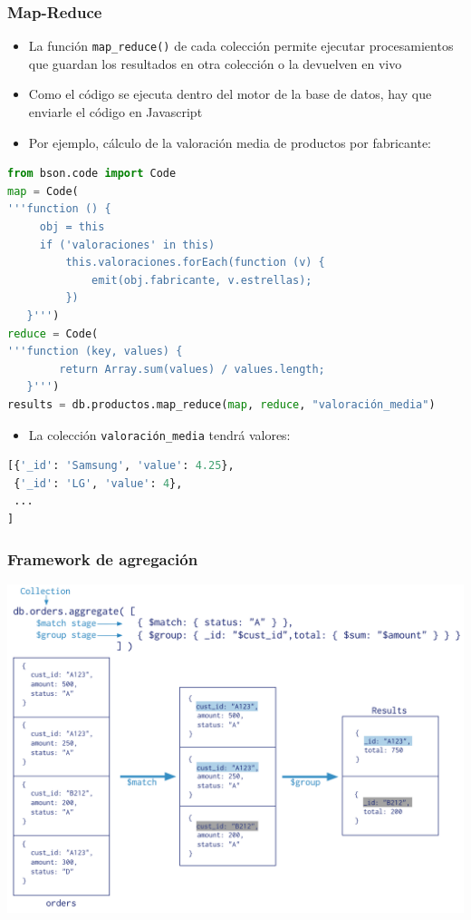 \documentclass[14pt]{beamer}
\begin{document}
\begin{frame}
  \frametitle{Map-Reduce}
  \begin{itemize}
  \item La función {\tt map\_reduce()} de cada colección permite ejecutar
    procesamientos que guardan los resultados en otra colección o la
    devuelven en vivo
  \item Como el código se ejecuta dentro del motor de la base de datos, hay
    que enviarle el código en Javascript
  \item Por ejemplo, cálculo de la valoración media de productos por
    fabricante:

  \end{itemize}

\framebreak
\begin{lstlisting}[language=Python]
from bson.code import Code
map = Code(
'''function () {
     obj = this
     if ('valoraciones' in this)
         this.valoraciones.forEach(function (v) {
             emit(obj.fabricante, v.estrellas);
         })
   }''')
reduce = Code(
'''function (key, values) {
        return Array.sum(values) / values.length;
   }''')
results = db.productos.map_reduce(map, reduce, "valoración_media")
\end{lstlisting}

\framebreak

\begin{itemize}
\item La colección {\tt valoración\_media} tendrá valores:
\end{itemize}

\begin{lstlisting}[language=Python]
[{'_id': 'Samsung', 'value': 4.25},
 {'_id': 'LG', 'value': 4},
 ...
]
\end{lstlisting}

\end{frame}


\begin{frame}
  \frametitle{Framework de agregación}
  \centering\includegraphics[height=.85\textheight]{img/mongo-aggregation}
\end{frame}
\end{document}
